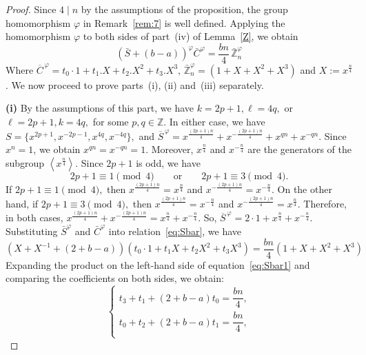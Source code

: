 \documentclass[12pt]{article}
\begin{document}
  	  \begin{proof}
  	Since $4\mid n$ by the assumptions of the proposition,  the group homomorphism $\varphi$ in Remark~\ref{rem:7} is well defined. Applying the homomorphism $\varphi$ to both sides of part~(iv) of Lemma~\ref{Z}, we obtain
  	\begin{equation}\label{eq:Sbar}
  		{ (\bar{S} + (b-a))^{\varphi}\bar{C}^{\varphi} = \frac{bn}{4}\,\bar{\mathbb{Z}}_{n}^{\varphi}}
  	\end{equation} 	
 Where $\overline{C}^{\,\varphi}= t_0\cdot 1+t_1.X+t_2.X^2+t_3.X^3$, $\bar{\mathbb{Z}}_{n}^{\varphi} = (1 + X + X^2 + X^3)$ and \(X := x^{\frac{n}{4}}\). We now proceed to prove parts~(i), (ii) and~(iii) separately.
  \par
  \indent\textbf{(i)} By the assumptions of this part, we have
  $
  k=2p+1, \ell=4q,
  $
  or
  $
  \ell=2p+1, k=4q,
  $
  for some \(p,q\in\mathbb{Z}\). In either case, we have
  $
  S=\{x^{2p+1},x^{-2p-1},x^{4q},x^{-4q}\},
  $
  and
 $
 \overline{S}^{\,\varphi}
 =
 x^{\frac{(2p+1)n}{4}}
 +x^{-\frac{(2p+1)n}{4}}
 +x^{qn}
 +x^{-qn}.
 $
 Since \(x^n=1\), we obtain
 $
 x^{qn}=x^{-qn}=1.
 $
 Moreover, \(x^{\frac{n}{4}}\) and \(x^{-\frac{n}{4}}\) are the generators of the subgroup
 \(\left\langle x^{\frac{n}{4}}\right\rangle\). Since \(2p+1\) is odd, we have
 \[
 2p+1\equiv 1 \pmod{4}
 \qquad\text{or}\qquad
 2p+1\equiv 3 \pmod{4}.
 \]
 If
 $
 2p+1\equiv 1 \pmod{4},
 $
 then
 $
 x^{\frac{(2p+1)n}{4}}=x^{\frac{n}{4}}$
and
$ x^{-\frac{(2p+1)n}{4}}=x^{-\frac{n}{4}}.
 $
 On the other hand, if
 $
 2p+1\equiv 3 \pmod{4},
 $
 then
 $
 x^{\frac{(2p+1)n}{4}}=x^{-\frac{n}{4}}$
 and
$ x^{-\frac{(2p+1)n}{4}}=x^{\frac{n}{4}}.$
 Therefore, in both cases,
 $
 x^{\frac{(2p+1)n}{4}}
 +x^{-\frac{(2p+1)n}{4}}
 =
 x^{\frac{n}{4}}+x^{-\frac{n}{4}}.
 $
 So,
 $
 \overline{S}^{\,\varphi}
 =
 2\cdot 1+x^{\frac{n}{4}}+x^{-\frac{n}{4}}.
 $
 Substituting \(\bar{S}^{\varphi}\) and $\bar{C}^{\varphi}$ into relation~\eqref{eq:Sbar}, we have
  \begin{equation}\label{eq:Sbar1}
  	\left(X + X^{-1} + (2+b-a)\right)\left(t_0 \cdot 1 + t_1X + t_2X^2 + t_3X^3\right)
  	=
  	\frac{bn}{4}(1 + X + X^2 + X^3)
  \end{equation}
  Expanding the product on the left-hand side of equation~\eqref{eq:Sbar1} and comparing the coefficients on both sides, we obtain:
  \[
  \begin{cases}
  	t_3 + t_1 + (2+b-a)t_0 = \dfrac{bn}{4},\\
  	t_0 + t_2 + (2+b-a)t_1 = \dfrac{bn}{4},\\

\end{cases}\]
\end{proof}
\end{document}
